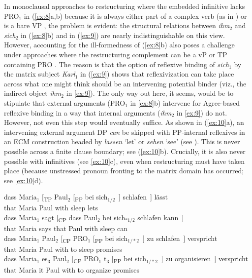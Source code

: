 \documentclass[output=paper]{langsci/langscibook}
\begin{document}
In monoclausal approaches to restructuring where the embedded infinitive lacks
PRO$_1$ in (\ref{ex:8}a,b) because it is always either part of a complex verb
(as in \citealt{Haider:10}) or is a bare VP \parencite{Sternefeld:06}, the
problem is evident: the structural relations between {\itshape ihm}$_2$ and {\it
sich}$_2$ in (\ref{ex:8}b) and in (\ref{ex:9}) are nearly indistinguishable on
this view.  However, accounting for the ill-formedness of (\ref{ex:8}b) also
poses a challenge under approaches where the restructuring complement can be a
vP or TP containing PRO \parencite{Wurmbrand:01}. The reason is that the option of
reflexive binding of {\itshape sich}$_1$ by the matrix subject {\itshape Karl}$_1$ in
(\ref{ex:9}) shows that reflexivization can take place across what one might
think should be an intervening potential binder (viz., the indirect object {\itshape
ihm}$_2$ in \ref{ex:9}). The only way out here, it seems, would be to
stipulate that external arguments (PRO$_1$ in \ref{ex:8}b) intervene for
Agree-based reflexive binding in a way that internal arguments ({\itshape ihm}$_2$
in \ref{ex:9}) do not. However, not even this step would eventually suffice.
As shown in (\ref{ex:10}a), an intervening external argument DP {\itshape can} be
skipped with PP-internal reflexives in an ECM construction headed by {\it
lassen} \enquote*{let} or {\itshape sehen} \enquote*{see} (see
\citealt{Reis:76,Grewendorf:83,Fanselow:87,Gunkel:03:inf,Barnickel:14}). This
is never possible across a finite clause boundary; see (\ref{ex:10}b).
Crucially, it is also never possible with  infinitives (see
\ref{ex:10}c), even when restructuring must have taken place (because
unstressed pronoun fronting to the matrix domain has occurred; see
\ref{ex:10}d).

\ea\label{ex:10} 
    \ea \gll dass Maria$_1$ [\textsubscript{TP} Paul$_2$ [\textsubscript{PP} bei sich$_{1/2}$~] schlafen~] lässt\\
    that Maria\textsubscript{\Nom}  {} Paul\textsubscript{\Acc} {} with \Refl{} sleep lets\\
    \ex \gll dass Maria$_1$ sagt [\textsubscript{CP} dass Paul$_2$ bei sich$_{*1/2}$ schlafen
      kann~]\\
    that Maria\textsubscript{\Nom} says {} that Paul\textsubscript{\Nom} with \Refl{} sleep can\\
    \ex \gll dass Maria$_1$ Paul$_2$ [\textsubscript{CP} PRO$_1$ [\textsubscript{PP} bei sich$_{1/*2}$~] zu schlafen~]
    verspricht\\
    that Maria\textsubscript{\Nom} Paul\textsubscript{\Dat} {} {} {}  with \Refl{} to sleep
    promises\\
    \ex \gll dass Maria$_1$ es$_3$ Paul$_2$ [\textsubscript{CP} PRO$_1$ t$_3$ [\textsubscript{PP} bei sich$_{1/*2}$~] zu
      organisieren~] verspricht\\
    that Maria\textsubscript{\Nom} it\textsubscript{\Acc} Paul\textsubscript{\Dat} {} {} {} {} with \Refl{} to organize promises\\
    \z
\z
\end{document}

